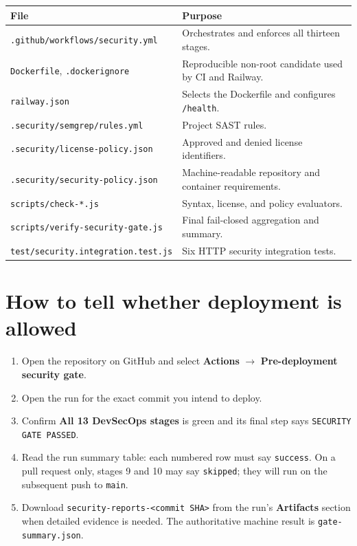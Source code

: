 \documentclass[11pt,a4paper]{article}
\begin{document}
\begin{longtable}{p{}p{}}
\toprule
\textbf{File} & \textbf{Purpose}\\
\midrule
\endhead
\texttt{.github/workflows/security.yml} & Orchestrates and enforces all thirteen stages.\\
\texttt{Dockerfile}, \texttt{.dockerignore} & Reproducible non-root candidate used by CI and Railway.\\
\texttt{railway.json} & Selects the Dockerfile and configures \texttt{/health}.\\
\texttt{.security/semgrep/rules.yml} & Project SAST rules.\\
\texttt{.security/license-policy.json} & Approved and denied license identifiers.\\
\texttt{.security/security-policy.json} & Machine-readable repository and container requirements.\\
\texttt{scripts/check-*.js} & Syntax, license, and policy evaluators.\\
\texttt{scripts/verify-security-gate.js} & Final fail-closed aggregation and summary.\\
\texttt{test/security.integration.test.js} & Six HTTP security integration tests.\\
\bottomrule
\end{longtable}

\section{How to tell whether deployment is allowed}

\begin{enumerate}
  \item Open the repository on GitHub and select \textbf{Actions} $\rightarrow$ \textbf{Pre-deployment security gate}.
  \item Open the run for the exact commit you intend to deploy.
  \item Confirm \textbf{All 13 DevSecOps stages} is green and its final step says \texttt{SECURITY GATE PASSED}.
  \item Read the run summary table: each numbered row must say \texttt{success}. On a pull request only, stages 9 and 10 may say \texttt{skipped}; they will run on the subsequent push to \texttt{main}.
  \item Download \texttt{security-reports-<commit SHA>} from the run's \textbf{Artifacts} section when detailed evidence is needed. The authoritative machine result is \texttt{gate-summary.json}.
\end{enumerate}
\end{document}
